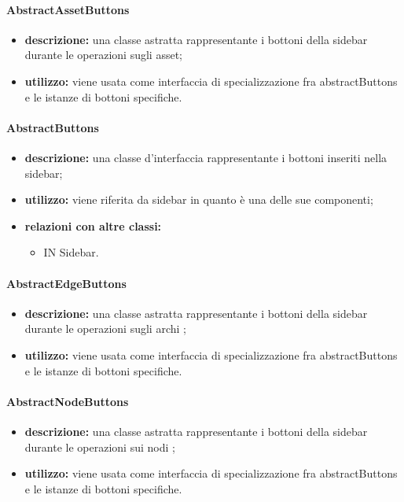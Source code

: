 \paragraph{AbstractAssetButtons}
\begin{itemize}
	\item \textbf{descrizione:} una classe astratta rappresentante i bottoni della sidebar durante le operazioni sugli asset;
	\item \textbf{utilizzo:} viene usata come interfaccia di specializzazione fra abstractButtons e le istanze di bottoni specifiche.
\end{itemize}
\paragraph{AbstractButtons}
\begin{itemize}
	\item \textbf{descrizione:} una classe d'interfaccia rappresentante i bottoni inseriti nella sidebar;
	\item \textbf{utilizzo:} viene riferita da sidebar in quanto è una delle sue componenti;
	\item \textbf{relazioni con altre classi:} 
	\begin{itemize}
		\item IN Sidebar.
	\end{itemize}
\end{itemize}
\paragraph{AbstractEdgeButtons}
\begin{itemize}
	\item \textbf{descrizione:} una classe astratta rappresentante i bottoni della sidebar durante le operazioni sugli archi
	;
	\item \textbf{utilizzo:} viene usata come interfaccia di specializzazione fra abstractButtons e le istanze di bottoni specifiche.
\end{itemize}
\paragraph{AbstractNodeButtons}
\begin{itemize}
	\item \textbf{descrizione:} una classe astratta rappresentante i bottoni della sidebar durante le operazioni sui nodi
	;
	\item \textbf{utilizzo:} viene usata come interfaccia di specializzazione fra abstractButtons e le istanze di bottoni specifiche.
\end{itemize}
